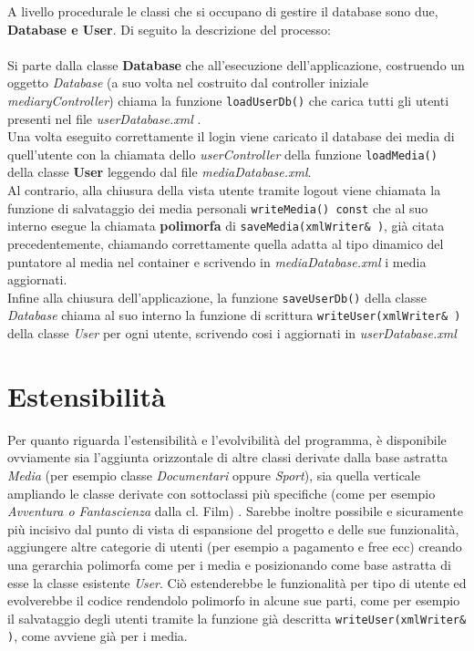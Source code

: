 \documentclass[10pt,a4paper,openany]{article}
\begin{document}
	A livello procedurale le classi che si occupano di gestire il database sono due, \textbf{Database e User}. Di seguito la descrizione del processo:\\\\
	Si parte dalla classe \textbf{Database} che all'esecuzione dell'applicazione, costruendo un oggetto \emph{Database} (a suo volta nel costruito dal controller iniziale	\emph{mediaryController}) chiama la funzione \texttt{loadUserDb()} che carica tutti gli utenti presenti nel file \emph{userDatabase.xml} .\\
	Una volta eseguito correttamente il login viene caricato il database dei media di quell'utente con la chiamata dello \emph{userController} della funzione 
	\texttt{loadMedia()} della classe \textbf{User} leggendo dal file \emph{mediaDatabase.xml}.\\
	Al contrario, alla chiusura della vista utente tramite logout viene chiamata la funzione di salvataggio dei media personali \texttt{writeMedia() const} che al suo interno 
	esegue la chiamata \textbf{polimorfa} di \texttt{saveMedia(xmlWriter\& )}, già citata precedentemente, chiamando correttamente quella adatta al tipo dinamico del 
	puntatore al media nel container e scrivendo in \emph{mediaDatabase.xml} i media aggiornati.\\
	Infine alla chiusura dell'applicazione, la funzione \texttt{saveUserDb()} della classe \emph{Database} chiama al suo interno la funzione di scrittura 
	\texttt{writeUser(xmlWriter\& )} della classe \emph{User} per ogni utente, scrivendo cosi i aggiornati in \emph{userDatabase.xml}
	
\section{Estensibilità}

Per quanto riguarda l'estensibilità e l'evolvibilità del programma, è disponibile ovviamente sia l'aggiunta orizzontale di altre classi derivate dalla base astratta \emph{Media}  (per esempio classe \emph{Documentari} oppure \emph{Sport}), sia quella verticale ampliando le classe derivate con sottoclassi più specifiche (come per esempio \emph{Avventura o Fantascienza} dalla cl. Film) .
Sarebbe inoltre possibile e sicuramente più incisivo dal punto di vista di espansione del progetto e delle sue funzionalità, aggiungere altre categorie di utenti (per esempio a pagamento e free ecc) creando una gerarchia polimorfa come per i media e posizionando come base astratta di esse la classe esistente \emph{User}.
Ciò estenderebbe le funzionalità per tipo di utente ed evolverebbe il codice rendendolo polimorfo in alcune sue parti, come per esempio il salvataggio degli utenti tramite la funzione già descritta \texttt{writeUser(xmlWriter\& )}, come avviene già per i media.
\end{document}
